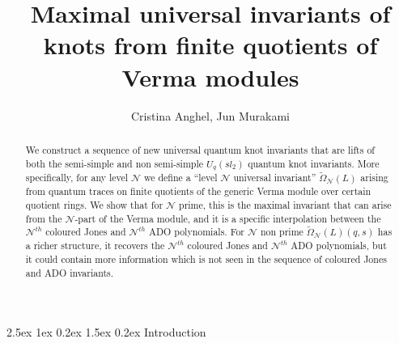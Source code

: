 \documentclass[reqno,a4paper,11pt]{amsart}
\makeatletter
\numberwithin{equation}{section}
\numberwithin{figure}{section}
\theoremstyle{definition}
\theoremstyle{plain}
\renewcommand*{\section}{\@startsection{section}{1}{\z@}%
	{2.5ex \@plus 1ex \@minus 0.2ex}%
	{1.5ex \@plus 0.2ex}%
	{\normalfont\normalsize\bfseries}}
\newcommand{\cN}{\mathcal{N}}
\makeatother
\begin{document}
\title[Maximal universal invariants from finite quotients of Verma modules]{Maximal universal invariants of knots from finite quotients of Verma modules}
\author{Cristina Anghel, Jun Murakami}
\date{}
\begin{abstract}

We construct a sequence of new universal quantum knot invariants that are lifts of both the semi-simple and non semi-simple $U_q(sl_2)$ quantum knot invariants. More specifically, for any level $\cN$ we define a ``level $\cN$ universal invariant'' $ \widetilde{\Omega}_{\cN}(L)$ arising from quantum traces on finite quotients of the generic Verma module over certain quotient rings. We show that for $\cN$ prime, this is the maximal invariant that can arise from the $\cN$-part of the Verma module, and it is a specific  interpolation between the $\cN^{th}$ coloured Jones and $\cN^{th}$ ADO polynomials. For $\cN$ non prime $ \widetilde{\Omega}_{\cN}(L)(q,s)$ has a richer structure, it recovers the  $\cN^{th}$ coloured Jones and $\cN^{th}$ ADO polynomials, but it could contain more information which is not seen in the sequence of coloured Jones and ADO invariants. 
\end{abstract}

\maketitle
{
\makeatletter
\renewcommand*{\BHFN@OldMakefntext}{}
\makeatother
}
\vspace{-5mm}

\section{Introduction}\label{introduction}
\end{document}
